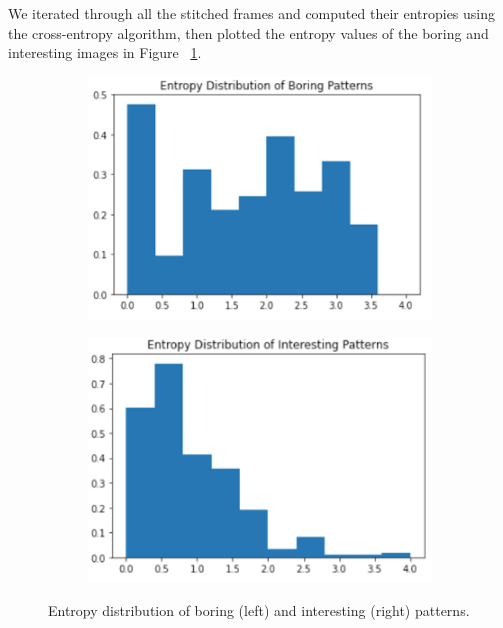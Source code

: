 \documentclass[12pt]{article}
\numberwithin{figure}{section} %
\begin{document}
We iterated through all the stitched frames and computed their entropies using the cross-entropy algorithm, then plotted the entropy values of the boring and interesting images in Figure ~\ref{fig:entropy distribution}. 
\begin{figure}[H]
	\begin{subfigure}{0.5 \textwidth}
		\centering
		\includegraphics[width=\linewidth]{Section3/4.1}
	\end{subfigure}
	\begin{subfigure}{0.5 \textwidth}
		\centering
		\includegraphics[width=\linewidth]{Section3/4.2}
	\end{subfigure}
	\caption[Entropy pattern distribution]{Entropy distribution of boring (left) and interesting (right) patterns.}
	\label{fig:entropy distribution}
	\vspace{-1.5em}
\end{figure}
\end{document}
